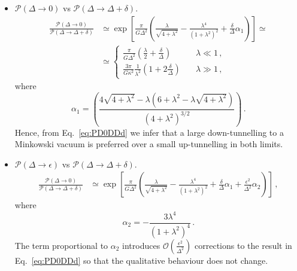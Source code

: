 \documentclass[11pt,a4paper]{article}
\begin{document}
\begin{itemize}
\item $\mathcal{P}(\Delta \rightarrow 0)$ vs $\mathcal{P}(\Delta \rightarrow \Delta + \delta)$.
\begin{align}
\frac{\mathcal{P}\left(\Delta \rightarrow 0\right)}{\mathcal{P}\left(\Delta \rightarrow \Delta + \delta\right)} &\simeq \exp\left[\frac{\pi}{G \Delta^2} \left(\frac{\lambda}{\sqrt{4 + \lambda^2}} - \frac{\lambda^4}{(1 + \lambda^2)^2} + \frac{\delta}{\Delta} \alpha_1\right)\right] \simeq \nonumber \\
&\simeq \begin{cases} \frac{\pi}{G \Delta^2} \left(\frac{\lambda}{2} + \frac{\delta}{\Delta}\right) \quad &\lambda \ll 1 \,, \\
\frac{3 \pi}{G \kappa^2} \frac{1}{\lambda^2} \left(1 + 2 \frac{\delta}{\Delta}\right) \quad &\lambda \gg 1 \,,
\end{cases}
\label{eq:PD0DDd}
\end{align}
where
\begin{equation}
\alpha_1 = \left(\frac{4 \sqrt{4 + \lambda^2} - \lambda \left(6 + \lambda^2 - \lambda \sqrt{4 + \lambda^2}\right)}{\left(4 + \lambda^2\right)^{3/2}}\right) \,.
\end{equation}
Hence, from Eq.~\eqref{eq:PD0DDd} we infer that a large down-tunnelling to a Minkowski vacuum is preferred over a small up-tunnelling in both limits.

\item $\mathcal{P}(\Delta \rightarrow \epsilon)$ vs $\mathcal{P}(\Delta \rightarrow \Delta + \delta)$.
\begin{align}
\frac{\mathcal{P}\left(\Delta \rightarrow 0\right)}{\mathcal{P}\left(\Delta \rightarrow \Delta + \delta\right)} &\simeq \exp\left[\frac{\pi}{G \Delta^2} \left(\frac{\lambda}{\sqrt{4 + \lambda^2}} - \frac{\lambda^4}{(1 + \lambda^2)^2} + \frac{\delta}{\Delta} \alpha_1 + \frac{\epsilon^2}{\Delta^2} \alpha_2\right)\right] \,, \nonumber
\label{eq:PDeDDd}
\end{align}
where
\begin{equation}
\alpha_2 = - \frac{3 \lambda^4}{\left(1 + \lambda^2\right)^4} \,. \nonumber
\end{equation}
The term proportional to $\alpha_2$ introduces $\mathcal{O}\left(\frac{\epsilon^2}{\Delta^2}\right)$ corrections to the result in Eq.~\eqref{eq:PD0DDd} so that the qualitative behaviour does not change.


\end{itemize}
\end{document}
